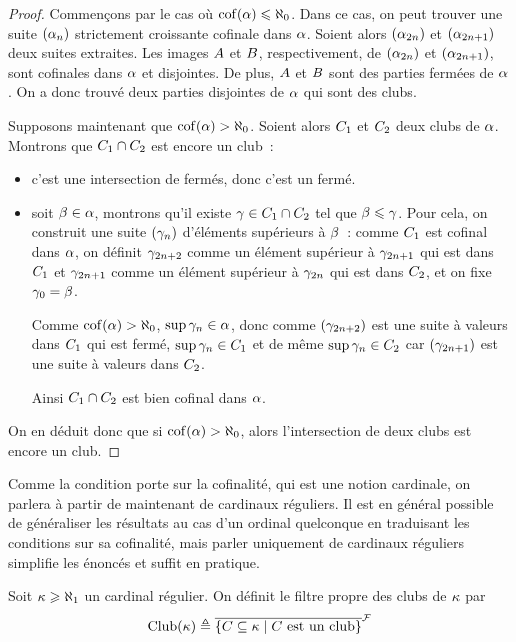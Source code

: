 \begin{proof}
  Commençons par le cas où $\operatorname{cof}(\alpha) \leqslant \aleph_0$. Dans ce cas, on peut
  trouver une suite $(\alpha_n)$ strictement croissante cofinale dans $\alpha$.
  Soient alors $(\alpha_{2n})$ et $(\alpha_{2n+1})$ deux suites extraites. Les
  images $A$ et $B$, respectivement, de $(\alpha_{2n})$ et
  $(\alpha_{2n+1})$, sont cofinales dans $\alpha$ et disjointes. De plus,
  $A$ et $B$ sont des parties fermées de $\alpha$. On a donc trouvé
  deux parties disjointes de $\alpha$ qui sont des clubs.

  Supposons maintenant que $\operatorname{cof}(\alpha) > \aleph_0$. Soient alors $C_1$ et
  $C_2$ deux clubs de $\alpha$. Montrons que $C_1\cap C_2$
  est encore un club~:
  \begin{itemize}
  \item c'est une intersection de fermés, donc c'est un fermé.
  \item soit $\beta \in \alpha$, montrons qu'il existe
    $\gamma \in C_1\cap C_2$ tel que $\beta \leqslant \gamma$. Pour
    cela, on construit une suite $(\gamma_n)$ d'éléments supérieurs à $\beta$~:
    comme $C_1$ est cofinal dans $\alpha$, on définit $\gamma_{2n+2}$
    comme un élément supérieur à $\gamma_{2n+1}$ qui est dans $C_1$ et
    $\gamma_{2n+1}$ comme un élément supérieur à $\gamma_{2n}$ qui est dans
    $C_2$, et on fixe $\gamma_0 = \beta$.

    Comme $\operatorname{cof}(\alpha) > \aleph_0$, $\sup \gamma_n \in \alpha$, donc comme
    $(\gamma_{2n+2})$ est une suite à valeurs dans $C_1$ qui est fermé,
    $\sup \gamma_n \in C_1$ et de même $\sup \gamma_n \in C_2$ car
    $(\gamma_{2n+1})$ est une suite à valeurs dans $C_2$.

    Ainsi $C_1\cap C_2$ est bien cofinal dans $\alpha$.
  \end{itemize}
  On en déduit donc que si $\operatorname{cof}(\alpha) > \aleph_0$, alors l'intersection de
  deux clubs est encore un club.
\end{proof}

Comme la condition porte sur la cofinalité, qui est une notion cardinale, on
parlera à partir de maintenant de cardinaux réguliers. Il est en général
possible de généraliser les résultats au cas d'un ordinal quelconque en
traduisant les conditions sur sa cofinalité, mais parler uniquement de cardinaux
réguliers simplifie les énoncés et suffit en pratique.

\begin{definition}
  Soit $\kappa \geqslant \aleph_1$ un cardinal régulier. On définit le filtre propre
  des clubs de $\kappa$ par
  \[\operatorname{Club}(\kappa) \triangleq
  \overline{\left\{ C\subseteq \kappa \;\middle\vert\; C\text{ est un club} \right\}}^{\mathcal{F}}\]
\end{definition}

